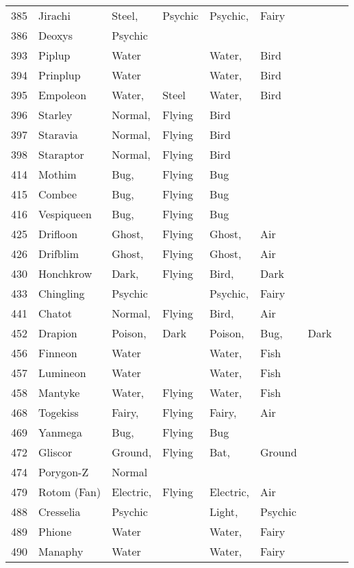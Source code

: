 \documentclass{article}
\begin{document}
\begin{longtable}{rl|ll|llll}
385 & Jirachi & Steel, & Psychic & Psychic, & Fairy &  &  \\
386 & Deoxys & Psychic &  &  &  &  &  \\
\hline %
393 & Piplup & Water &  & Water, & Bird &  &  \\
394 & Prinplup & Water &  & Water, & Bird &  &  \\
395 & Empoleon & Water, & Steel & Water, & Bird &  &  \\
396 & Starley & Normal, & Flying & Bird &  &  &  \\
397 & Staravia & Normal, & Flying & Bird &  &  &  \\
398 & Staraptor & Normal, & Flying & Bird &  &  &  \\
414 & Mothim & Bug, & Flying & Bug &  &  &  \\
415 & Combee & Bug, & Flying & Bug &  &  &  \\
416 & Vespiqueen & Bug, & Flying & Bug &  &  &  \\
425 & Drifloon & Ghost, & Flying & Ghost, & Air &  &  \\
426 & Drifblim & Ghost, & Flying & Ghost, & Air &  &  \\
430 & Honchkrow & Dark, & Flying & Bird, & Dark &  &  \\
433 & Chingling & Psychic &  & Psychic, & Fairy &  &  \\
441 & Chatot & Normal, & Flying & Bird, & Air &  &  \\
452 & Drapion & Poison, & Dark & Poison, & Bug, & Dark &  \\
456 & Finneon & Water &  & Water, & Fish &  &  \\
457 & Lumineon & Water &  & Water, & Fish &  &  \\
458 & Mantyke & Water, & Flying & Water, & Fish &  &  \\
468 & Togekiss & Fairy, & Flying & Fairy, & Air &  &  \\
469 & Yanmega & Bug, & Flying & Bug &  &  &  \\
472 & Gliscor & Ground, & Flying & Bat, & Ground &  &  \\
474 & Porygon-Z & Normal &  &  &  &  &  \\
479 & Rotom (Fan) & Electric, & Flying & Electric, & Air &  &  \\
488 & Cresselia & Psychic &  & Light, & Psychic &  &  \\
489 & Phione & Water &  & Water, & Fairy &  &  \\
490 & Manaphy & Water &  & Water, & Fairy &  &  \\

\end{longtable}
\end{document}
